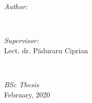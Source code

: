 \begin{titlepage}

\begin{minipage}{0.4\textwidth}
\begin{flushleft} \large
\emph{Author:}\\
\@author %
\end{flushleft}
\end{minipage}
~
\begin{minipage}{0.4\textwidth}
\begin{flushright} \large
\emph{Supervisor:} \\
Lect. dr. P\u{a}duraru Ciprian
\end{flushright}
\end{minipage}\\[3cm]
\makeatother



{\large \emph{BSc Thesis}}\\[0.5cm]
{\large February, 2020}\\[2cm] %

\vfill %

\end{titlepage}